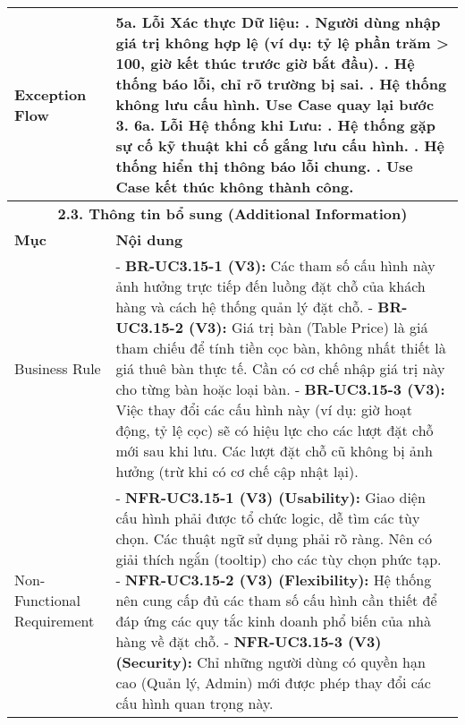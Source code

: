 \begin{longtable}{|m{4cm}|p{11cm}|}
Exception Flow & \textbf{5a. Lỗi Xác thực Dữ liệu:} \newline    1. Người dùng nhập giá trị không hợp lệ (ví dụ: tỷ lệ phần trăm > 100, giờ kết thúc trước giờ bắt đầu). \newline    2. Hệ thống báo lỗi, chỉ rõ trường bị sai. \newline    3. Hệ thống không lưu cấu hình. Use Case quay lại bước 3. \newline \textbf{6a. Lỗi Hệ thống khi Lưu:} \newline    1. Hệ thống gặp sự cố kỹ thuật khi cố gắng lưu cấu hình. \newline    2. Hệ thống hiển thị thông báo lỗi chung. \newline    3. Use Case kết thúc không thành công. \\
\hline
\multicolumn{2}{|c|}{\textbf{2.3. Thông tin bổ sung (Additional Information)}} \\
\hline
\textbf{Mục} & \textbf{Nội dung} \\
\hline
Business Rule & - \textbf{BR-UC3.15-1 (V3):} Các tham số cấu hình này ảnh hưởng trực tiếp đến luồng đặt chỗ của khách hàng và cách hệ thống quản lý đặt chỗ. \newline - \textbf{BR-UC3.15-2 (V3):} Giá trị bàn (Table Price) là giá tham chiếu để tính tiền cọc bàn, không nhất thiết là giá thuê bàn thực tế. Cần có cơ chế nhập giá trị này cho từng bàn hoặc loại bàn. \newline - \textbf{BR-UC3.15-3 (V3):} Việc thay đổi các cấu hình này (ví dụ: giờ hoạt động, tỷ lệ cọc) sẽ có hiệu lực cho các lượt đặt chỗ mới sau khi lưu. Các lượt đặt chỗ cũ không bị ảnh hưởng (trừ khi có cơ chế cập nhật lại). \\
\hline
Non-Functional Requirement & - \textbf{NFR-UC3.15-1 (V3) (Usability):} Giao diện cấu hình phải được tổ chức logic, dễ tìm các tùy chọn. Các thuật ngữ sử dụng phải rõ ràng. Nên có giải thích ngắn (tooltip) cho các tùy chọn phức tạp. \newline - \textbf{NFR-UC3.15-2 (V3) (Flexibility):} Hệ thống nên cung cấp đủ các tham số cấu hình cần thiết để đáp ứng các quy tắc kinh doanh phổ biến của nhà hàng về đặt chỗ. \newline - \textbf{NFR-UC3.15-3 (V3) (Security):} Chỉ những người dùng có quyền hạn cao (Quản lý, Admin) mới được phép thay đổi các cấu hình quan trọng này. \\
\hline
\end{longtable}


